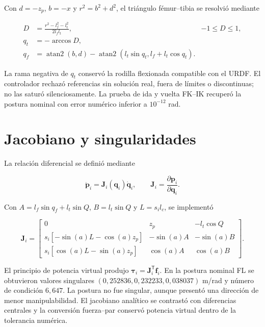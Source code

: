 Con $d=-z_p$, $b=-x$ y $r^2=b^2+d^2$, el triángulo fémur--tibia se resolvió
mediante

\begin{align}
D&=\frac{r^2-l_f^2-l_t^2}{2l_fl_t},&-1\leq D\leq1,\\
q_t&=-\arccos D,\label{eq:nova-knee}\\
q_f&=\operatorname{atan2}(b,d)-
\operatorname{atan2}\left(l_t\sin q_t,l_f+l_t\cos q_t\right).
\label{eq:nova-ikfemur}
\end{align}

La rama negativa de $q_t$ conservó la rodilla flexionada compatible con el
URDF. El controlador rechazó referencias sin solución real, fuera de límites o
discontinuas; no las saturó silenciosamente. La prueba de ida y vuelta FK--IK
recuperó la postura nominal con error numérico inferior a $10^{-12}$ rad.

\section{Jacobiano y singularidades}

La relación diferencial se definió mediante

\begin{equation}
\dot{\mathbf p}_i=\mathbf J_i(\mathbf q_i)\dot{\mathbf q}_i,
\qquad
\mathbf J_i=\frac{\partial\mathbf p_i}{\partial\mathbf q_i}.
\label{eq:nova-jacobian-definition}
\end{equation}

Con $A=l_f\sin q_f+l_t\sin Q$, $B=l_t\sin Q$ y $L=s_il_c$, se implementó

\begin{equation}
\mathbf J_i=
\begin{bmatrix}
0&z_p&-l_t\cos Q\\
s_i[-\sin(a)L-\cos(a)z_p]&-\sin(a)A&-\sin(a)B\\
s_i[\cos(a)L-\sin(a)z_p]&\cos(a)A&\cos(a)B
\end{bmatrix}.
\label{eq:nova-jacobian}
\end{equation}

El principio de potencia virtual produjo
$\boldsymbol\tau_i=\mathbf J_i^{\mathsf T}\mathbf f_i$. En la postura nominal
FL se obtuvieron valores singulares
$(0,252836,0,232233,0,038037)$ m/rad y número de condición $6,647$. La postura
no fue singular, aunque presentó una dirección de menor manipulabilidad. El
jacobiano analítico se contrastó con diferencias centrales y la conversión
fuerza--par conservó potencia virtual dentro de la tolerancia numérica.

